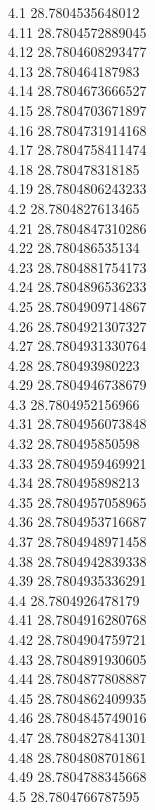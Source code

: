 {4.1	28.7804535648012\\
4.11	28.7804572889045\\
4.12	28.7804608293477\\
4.13	28.780464187983\\
4.14	28.7804673666527\\
4.15	28.7804703671897\\
4.16	28.7804731914168\\
4.17	28.7804758411474\\
4.18	28.780478318185\\
4.19	28.7804806243233\\
4.2	28.7804827613465\\
4.21	28.7804847310286\\
4.22	28.780486535134\\
4.23	28.7804881754173\\
4.24	28.7804896536233\\
4.25	28.7804909714867\\
4.26	28.7804921307327\\
4.27	28.7804931330764\\
4.28	28.780493980223\\
4.29	28.7804946738679\\
4.3	28.7804952156966\\
4.31	28.7804956073848\\
4.32	28.780495850598\\
4.33	28.7804959469921\\
4.34	28.780495898213\\
4.35	28.7804957058965\\
4.36	28.7804953716687\\
4.37	28.7804948971458\\
4.38	28.7804942839338\\
4.39	28.7804935336291\\
4.4	28.7804926478179\\
4.41	28.7804916280768\\
4.42	28.7804904759721\\
4.43	28.7804891930605\\
4.44	28.7804877808887\\
4.45	28.7804862409935\\
4.46	28.7804845749016\\
4.47	28.7804827841301\\
4.48	28.7804808701861\\
4.49	28.7804788345668\\
4.5	28.7804766787595\\
}
